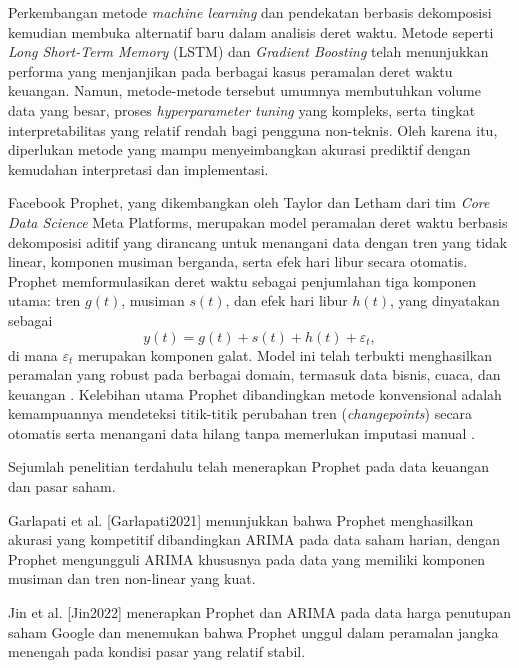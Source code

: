 \documentclass[11pt,twoside]{article}
\begin{document}
Perkembangan metode \textit{machine learning} dan pendekatan berbasis dekomposisi kemudian
membuka alternatif baru dalam analisis deret waktu. Metode seperti \textit{Long Short-Term Memory}
(LSTM) \cite{Hochreiter1997} dan \textit{Gradient Boosting} \cite{Chen2016} telah menunjukkan performa yang menjanjikan
pada berbagai kasus peramalan deret waktu keuangan. Namun, metode-metode tersebut umumnya
membutuhkan volume data yang besar, proses \textit{hyperparameter tuning} yang kompleks, serta
tingkat interpretabilitas yang relatif rendah bagi pengguna non-teknis. Oleh karena itu, diperlukan
metode yang mampu menyeimbangkan akurasi prediktif dengan kemudahan interpretasi dan
implementasi.

Facebook Prophet, yang dikembangkan oleh Taylor dan Letham \cite{Taylor2018} dari tim \textit{Core Data
Science} Meta Platforms, merupakan model peramalan deret waktu berbasis dekomposisi aditif yang
dirancang untuk menangani data dengan tren yang tidak linear, komponen musiman berganda, serta
efek hari libur secara otomatis. Prophet memformulasikan deret waktu sebagai penjumlahan tiga
komponen utama: tren $g(t)$, musiman $s(t)$, dan efek hari libur $h(t)$, yang dinyatakan sebagai
\begin{equation*}
    y(t) = g(t) + s(t) + h(t) + \varepsilon_t,
\end{equation*}
di mana $\varepsilon_t$ merupakan komponen galat. Model ini telah terbukti menghasilkan peramalan
yang robust pada berbagai domain, termasuk data bisnis, cuaca, dan keuangan \cite{Taylor2018}. Kelebihan
utama Prophet dibandingkan metode konvensional adalah kemampuannya mendeteksi titik-titik
perubahan tren (\textit{changepoints}) secara otomatis serta menangani data hilang tanpa memerlukan
imputasi manual \cite{Taylor2018}.

Sejumlah penelitian terdahulu telah menerapkan Prophet pada data keuangan dan pasar saham.

Garlapati et al. [Garlapati2021] menunjukkan bahwa Prophet menghasilkan akurasi yang kompetitif dibandingkan ARIMA pada data saham harian, dengan Prophet mengungguli ARIMA khususnya pada data yang memiliki komponen musiman dan tren non-linear yang kuat.

Jin et al. [Jin2022] menerapkan Prophet dan ARIMA pada data harga penutupan saham Google dan menemukan bahwa Prophet unggul dalam peramalan jangka menengah pada kondisi pasar yang relatif stabil.
\end{document}
